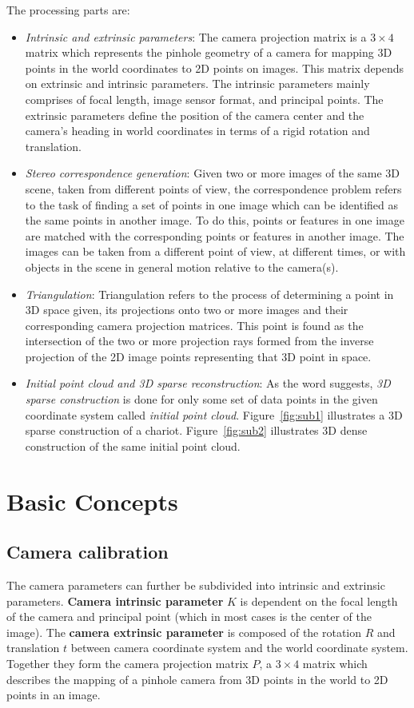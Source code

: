 \documentclass{article}
\begin{document}
		The processing parts are:
			\begin{itemize}
			\item \textit{Intrinsic and extrinsic parameters}: The camera projection matrix is a $3 \times 4$ matrix which represents the pinhole geometry of a camera for mapping 3D points in the world coordinates to 2D points on images. This matrix depends on extrinsic and intrinsic parameters. The intrinsic parameters mainly comprises of focal length, image sensor format, and principal points. The extrinsic parameters define the position of the camera center and the camera's heading in world coordinates in terms of a rigid rotation and translation. 
			\item \textit{Stereo correspondence generation}: Given two or more images of the same 3D scene, taken from different points of view, the \cite{zissermanfeatures} correspondence problem refers to the task of finding a set of points in one image which can be identified as the same points in another image. To do this, points or features in one image are matched with the corresponding points or features in another image. The images can be taken from a different point of view, at different times, or with objects in the scene in general motion relative to the camera(s).
			\item \textit{Triangulation}: \cite{zisserman} Triangulation refers to the process of determining a point in 3D space given, its projections onto two or more images and their corresponding camera projection matrices. This point is found as the intersection of the two or more projection rays formed from the inverse projection of the 2D image points representing that 3D point in space.
			\item \textit{Initial point cloud and 3D sparse reconstruction}: As the word suggests, \textit{3D sparse construction} is done for only some set of data points in the given coordinate system called \textit{initial point cloud}. Figure~\ref{fig:sub1} illustrates a 3D sparse construction of a chariot. Figure~\ref{fig:sub2} illustrates 3D dense construction of the same initial point cloud.

			\end{itemize}
	
\section{Basic Concepts} 
			\subsection{Camera calibration}
				The camera parameters can further be subdivided into intrinsic and extrinsic parameters. \textbf{Camera intrinsic parameter} $K$ is dependent on the focal length of the camera and principal point (which in most cases is the center of the image). The \textbf{camera extrinsic parameter} is composed of the rotation $R$ and translation $t$ between camera coordinate system and the world coordinate system. Together they form the camera projection matrix $P$, a $3 \times 4$ matrix which describes the mapping of a pinhole camera from 3D points in the world to 2D points in an image.
\end{document}
